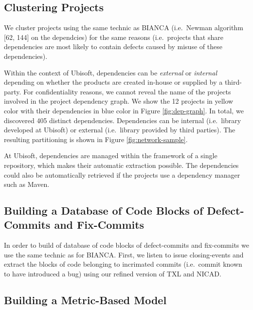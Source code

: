 \documentclass[12pt]{report}
\begin{document}
\subsection{Clustering Projects}\label{sec:clustering}

We cluster projects using the same technic as BIANCA (i.e.~Newman
algorithm {[}62, 144{]} on the dependcies) for the same reasons
(i.e.~projects that share dependencies are most likely to contain
defects caused by misuse of these dependencies).

Within the context of Ubisoft, dependencies can be \emph{external} or
\emph{internal} depending on whether the products are created in-house
or supplied by a third-party. For confidentiality reasons, we cannot
reveal the name of the projects involved in the project dependency
graph. We show the 12 projects in yellow color with their dependencies
in blue color in Figure \ref{fig:dep-graph}. In total, we discovered 405
distinct dependencies. Dependencies can be internal (i.e.~library
developed at Ubisoft) or external (i.e.~library provided by third
parties). The resulting partitioning is shown in Figure
\ref{fig:network-sample}.



At Ubisoft, dependencies are managed within the framework of a single
repository, which makes their automatic extraction possible. The
dependencies could also be automatically retrieved if the projects use a
dependency manager such as Maven.



\subsection{Building a Database of Code Blocks of Defect-Commits and
Fix-Commits}\label{sec:offline}

In order to build of database of code blocks of defect-commits and
fix-commits we use the same technic as for BIANCA. First, we listen to
issue closing-events and extract the blocks of code belonging to
incrimated commits (i.e.~commit known to have introduced a bug) using
our refined version of TXL and NICAD.

\subsection{Building a Metric-Based Model}\label{sec:metric-based}
\end{document}
